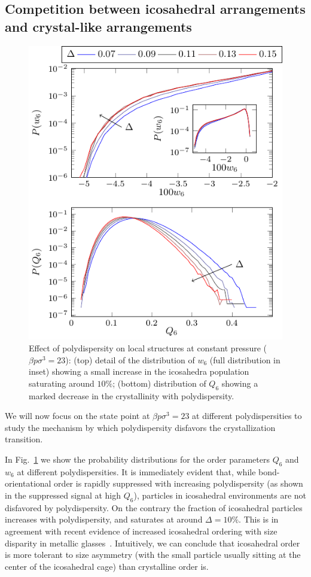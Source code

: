 \documentclass[twocolumn,superscriptaddress]{revtex4}
\begin{document}
\subsection{Competition between icosahedral arrangements and crystal-like arrangements}\label{sec:icosahedra}

\begin{figure}
 \centering
 \includegraphics{fig_polydistrib}
 \caption{Effect of polydispersity on local structures at constant pressure ($\beta p\sigma^3=23$): (top) detail of the distribution of $w_6$ (full distribution in inset) showing a small increase in the icosahedra population saturating around $10\%$; (bottom) distribution of $Q_6$ showing a marked decrease in the crystallinity with polydispersity.}
 \label{fig:polydispersity}
\end{figure}

We will now focus on the state point at $\beta p\sigma^3=23$ at different polydispersities to
study the mechanism by which polydispersity disfavors the crystallization transition.

In Fig.~\ref{fig:polydispersity} we show the probability distributions for the order
parameters $Q_6$ and $w_6$ at different polydispersities. It is immediately
evident that, while bond-orientational order is rapidly suppressed with increasing
polydispersity (as shown in the suppressed signal at high $Q_6$), particles in icosahedral
environments are not disfavored by polydispersity. On the contrary the fraction of
icosahedral particles increases with polydispersity, and saturates at around $\Delta=10\%$.
This is in agreement with recent evidence of increased icosahedral ordering with size disparity
in metallic glasses~\cite{Shimono2012}. Intuitively, we can conclude that icosahedral order is more tolerant to size
asymmetry (with the small particle usually sitting at the center of the icosahedral cage) than crystalline order is.
\end{document}
